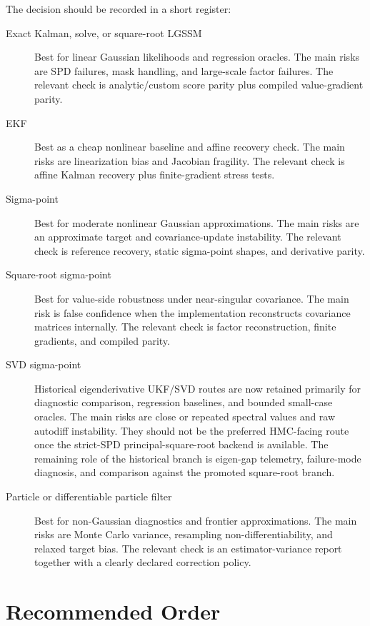 The decision should be recorded in a short register:
\begin{description}
  \item[Exact Kalman, solve, or square-root LGSSM]
  Best for linear Gaussian likelihoods and regression oracles.  The main risks
  are SPD failures, mask handling, and large-scale factor failures.  The
  relevant check is analytic/custom score parity plus compiled value-gradient
  parity.

  \item[EKF]
  Best as a cheap nonlinear baseline and affine recovery check.  The main risks
  are linearization bias and Jacobian fragility.  The relevant check is affine
  Kalman recovery plus finite-gradient stress tests.

  \item[Sigma-point]
  Best for moderate nonlinear Gaussian approximations.  The main risks are an
  approximate target and covariance-update instability.  The relevant check is
  reference recovery, static sigma-point shapes, and derivative parity.

  \item[Square-root sigma-point]
  Best for value-side robustness under near-singular covariance.  The main risk
  is false confidence when the implementation reconstructs covariance matrices
  internally.  The relevant check is factor reconstruction, finite gradients,
  and compiled parity.

  \item[SVD sigma-point]
  Historical eigenderivative UKF/SVD routes are now retained primarily for
  diagnostic comparison, regression baselines, and bounded small-case oracles.
  The main risks are close or repeated spectral values and raw autodiff
  instability.  They should not be the preferred HMC-facing route once the
  strict-SPD principal-square-root backend is available.  The remaining role of
  the historical branch is eigen-gap telemetry, failure-mode diagnosis, and
  comparison against the promoted square-root branch.

  \item[Particle or differentiable particle filter]
  Best for non-Gaussian diagnostics and frontier approximations.  The main
  risks are Monte Carlo variance, resampling non-differentiability, and relaxed
  target bias.  The relevant check is an estimator-variance report together with
  a clearly declared correction policy.
\end{description}

\section{Recommended Order}
\label{sec:bf-filter-choice-order}

